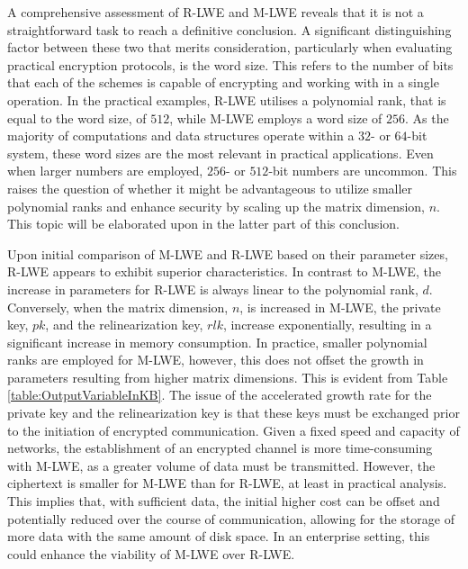 A comprehensive assessment of R-LWE and M-LWE reveals that it is not a straightforward task to reach a definitive conclusion. A significant distinguishing factor between these two that merits consideration, particularly when evaluating practical encryption protocols, is the word size. This refers to the number of bits that each of the schemes is capable of encrypting and working with in a single operation. In the practical examples, R-LWE utilises a polynomial rank, that is equal to the word size, of $512$, while M-LWE employs a word size of $256$. As the majority of computations and data structures operate within a $32$- or $64$-bit system, these word sizes are the most relevant in practical applications. Even when larger numbers are employed, $256$- or $512$-bit numbers are uncommon. This raises the question of whether it might be advantageous to utilize smaller polynomial ranks and enhance security by scaling up the matrix dimension, $n$. This topic will be elaborated upon in the latter part of this conclusion.

Upon initial comparison of M-LWE and R-LWE based on their parameter sizes, R-LWE appears to exhibit superior characteristics. In contrast to M-LWE, the increase in parameters for R-LWE is always linear to the polynomial rank, $d$. Conversely, when the matrix dimension, $n$, is increased in M-LWE, the private key, $pk$, and the relinearization key, $rlk$, increase exponentially, resulting in a significant increase in memory consumption. 
In practice, smaller polynomial ranks are employed for M-LWE, however, this does not offset the growth in parameters resulting from higher matrix dimensions. This is evident from Table \ref{table:OutputVariableInKB}. The issue of the accelerated growth rate for the private key and the relinearization key is that these keys must be exchanged prior to the initiation of encrypted communication. Given a fixed speed and capacity of networks, the establishment of an encrypted channel is more time-consuming with M-LWE, as a greater volume of data must be transmitted. However, the ciphertext is smaller for M-LWE than for R-LWE, at least in practical analysis. This implies that, with sufficient data, the initial higher cost can be offset and potentially reduced over the course of communication, allowing for the storage of more data with the same amount of disk space. In an enterprise setting, this could enhance the viability of M-LWE over R-LWE. 

